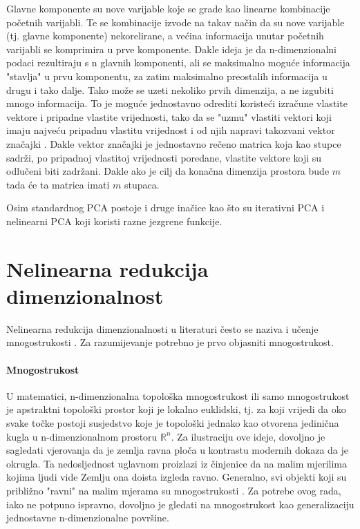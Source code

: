 \documentclass[times, utf8, diplomski]{fer}
\begin{document}
Glavne komponente su nove varijable koje se grade kao linearne kombinacije početnih varijabli. Te se kombinacije izvode na takav način da su nove varijable (tj. glavne komponente) nekorelirane, a većina informacija unutar početnih varijabli se komprimira u prve komponente. Dakle ideja je da n-dimenzionalni podaci rezultiraju s n glavnih komponenti, ali se maksimalno moguće informacija "stavlja" u prvu komponentu, za zatim maksimalno preostalih informacija u drugu i tako dalje. Tako može se uzeti nekoliko prvih dimenzija, a ne izgubiti mnogo informacija. To je moguće jednostavno odrediti koristeći izračune vlastite vektore i pripadne vlastite vrijednosti, tako da se "uzmu" vlastiti vektori koji imaju najveću pripadnu vlastitu vrijednost i od njih napravi takozvani vektor značajki . Dakle vektor značajki je jednostavno rečeno matrica koja kao stupce sadrži, po pripadnoj vlastitoj vrijednosti poredane, vlastite vektore koji su odlučeni biti zadržani. Dakle ako je cilj da konačna dimenzija prostora bude $m$ tada će ta matrica imati $m$ stupaca.

Osim standardnog PCA postoje i druge inačice kao što su iterativni PCA i nelinearni PCA koji koristi razne jezgrene  funkcije.

\newpage
\section{Nelinearna redukcija dimenzionalnost}\label{sec:nonlin_reduc}

Nelinearna redukcija dimenzionalnosti u literaturi često se naziva i učenje mnogostrukosti . Za razumijevanje potrebno je prvo objasniti mnogostrukost.

\paragraph{Mnogostrukost}
U matematici, n-dimenzionalna topološka mnogostrukost ili samo mnogostrukost je apstraktni topološki prostor koji je lokalno euklidski, tj. za koji vrijedi da oko svake točke postoji susjedstvo koje je topološki jednako kao otvorena jedinična kugla u n-dimenzionalnom prostoru $\mathbb{R}^n$. Za ilustraciju ove ideje, dovoljno je sagledati vjerovanja da je zemlja ravna ploča u kontrastu modernih dokaza da je okrugla. Ta nedosljednost uglavnom proizlazi iz činjenice da na malim mjerilima kojima ljudi vide Zemlju ona doista izgleda ravno. Generalno, svi objekti koji su približno "ravni" na malim mjerama su mnogostrukosti \citep{rowland}.
Za potrebe ovog rada, iako ne potpuno ispravno, dovoljno je gledati na mnogostrukost kao generalizaciju jednostavne n-dimenzionalne površine.
\end{document}

